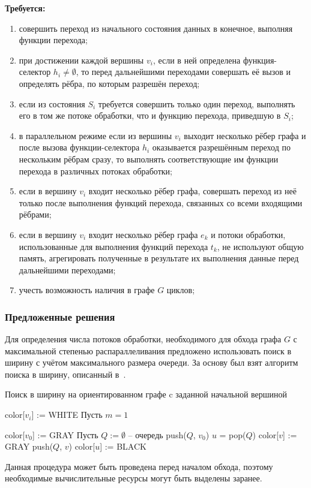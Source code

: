 \textbf{Требуется:}
\begin{enumerate}[label=\arabic*)]
	\item совершить переход из начального состояния данных в конечное, выполняя функции перехода;
	\item при достижении каждой вершины $v_i$, если в ней определена функция-селектор $h_i \neq \emptyset$, то перед дальнейшими переходами совершать её вызов и определять рёбра, по которым разрешён переход;
	\item если из состояния $S_i$ требуется совершить только один переход, выполнять его в том же потоке обработки, что и функцию перехода, приведшую в $S_i$; \label{elem:req_keepSameThread}
	\item в параллельном режиме если из вершины $v_i$ выходит несколько рёбер графа и после вызова функции-селектора $h_i$ оказывается разрешённым переход по нескольким рёбрам сразу, то выполнять соответствующие им функции перехода в различных потоках обработки; \label{elem:req_DoParallel}
	\item если в вершину $v_i$ входит несколько рёбер графа, совершать переход из неё только после выполнения функций перехода, связанных со всеми входящими рёбрами; \label{elem:req_syncInJoint}
	\item если в вершину $v_i$ входит несколько рёбер графа $e_k$ и потоки обработки, использованные для выполнения функций перехода $t_k$, не используют общую память, агрегировать полученные в результате их выполнения данные перед дальнейшими переходами; \label{elem:req_aggregateInJoint}
	\item учесть возможность наличия в графе $G$ циклов;
\end{enumerate}

\subsubsection{Предложенные решения}
Для определения числа потоков обработки, необходимого для обхода графа $G$ с максимальной степенью распараллеливания предложено использовать поиск в ширину с учётом максимального размера очереди. За основу был взят алгоритм поиска в ширину, описанный в~\cite{Cormen2005}.
\begin{algorithm}[H]
	\caption{Поиск в ширину на ориентированном графе c заданной начальной вершиной}
	\label{lst:bfs}
	\begin{algorithmic}[1]
		\State color[$v_i$] := WHITE
		\EndFor
		\State Пусть $m = 1$ 

		\State color[$v_0$] := GRAY
		\State Пусть $Q := \emptyset$ -- очередь
		\State push($Q$, $v_0$)
		\State $u$ = pop($Q$)
		\State color[$v$] := GRAY
		\State push($Q$, $v$)
		\EndIf
		\EndFor
		\State color[$u$] := BLACK
		\EndIf
		\EndWhile
		\EndProcedure
	\end{algorithmic}
\end{algorithm}
Данная процедура может быть проведена перед началом обхода, поэтому необходимые вычислительные ресурсы могут быть выделены заранее.


